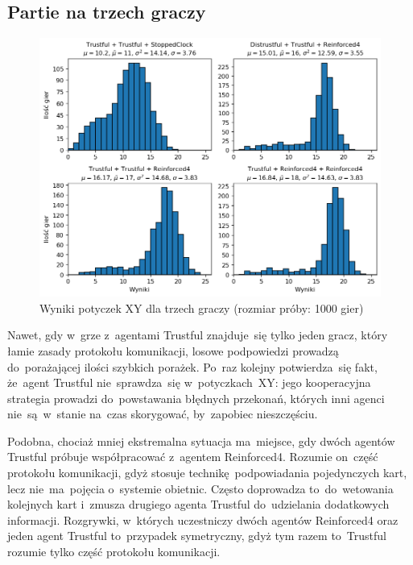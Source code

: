 \documentclass[declaration,shortabstract,inz]{iithesis}
\begin{document}
\subsection{Partie na trzech graczy}

\begin{figure}[H]
	\centering
	\captionsetup{format=hang}
	\includegraphics[width=\textwidth,height=\textheight,keepaspectratio]{XY3.png}
	\caption[Caption]{Wyniki potyczek XY dla trzech graczy (rozmiar próby: 1000 gier)}
	\label{fig:XY3}
\end{figure}

Nawet, gdy w~grze z~agentami Trustful znajduje~się tylko jeden gracz, który łamie zasady protokołu komunikacji, losowe podpowiedzi prowadzą do~porażającej ilości szybkich porażek. Po~raz kolejny potwierdza~się fakt, że~agent Trustful nie~sprawdza~się w~potyczkach~XY: jego kooperacyjna strategia prowadzi do~powstawania błędnych przekonań, których inni agenci nie~są~w~stanie na~czas skorygować, by~zapobiec nieszczęściu.

Podobna, chociaż mniej ekstremalna sytuacja ma~miejsce, gdy dwóch agentów Trustful próbuje współpracować z~agentem Reinforced4. Rozumie on~część protokołu komunikacji, gdyż stosuje technikę podpowiadania pojedynczych kart, lecz nie~ma~pojęcia o~systemie obietnic. Często doprowadza to~do~wetowania kolejnych kart i~zmusza drugiego agenta Trustful do~udzielania dodatkowych informacji. Rozgrywki, w~których uczestniczy dwóch agentów Reinforced4 oraz jeden agent Trustful to~przypadek symetryczny, gdyż tym razem to~Trustful rozumie tylko część protokołu komunikacji.
\end{document}
